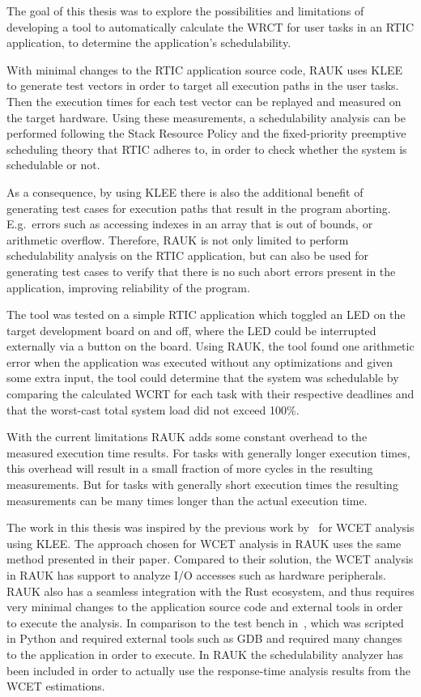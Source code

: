 The goal of this thesis was to explore the possibilities and limitations of
developing a tool to automatically calculate the WRCT for user tasks in an
RTIC application, to determine the application's schedulability.

With minimal changes to the RTIC application source code, RAUK uses KLEE to
generate test vectors in order to target all execution paths in the user tasks.
Then the execution times for each test vector can be replayed and measured on
the target hardware. Using these measurements, a schedulability analysis can be
performed following the Stack Resource Policy and the fixed-priority preemptive
scheduling theory that RTIC adheres to, in order to check whether the system is
schedulable or not.

As a consequence, by using KLEE there is also the additional benefit of
generating test cases for execution paths that result in the program aborting.
E.g.\ errors such as accessing indexes in an array that is out of bounds, or
arithmetic overflow. Therefore, RAUK is not only limited to perform
schedulability analysis on the RTIC application, but can also be used for
generating test cases to verify that there is no such abort errors present in
the application, improving reliability of the program.

The tool was tested on a simple RTIC application which toggled an LED on the
target development board on and off, where the LED could be interrupted
externally via a button on the board. Using RAUK, the tool found one arithmetic
error when the application was executed without any optimizations and given
some extra input, the tool could determine that the system was schedulable by
comparing the calculated WCRT for each task with their respective deadlines and
that the worst-cast total system load did not exceed 100\%.

With the current limitations RAUK adds some constant overhead to the measured
execution time results. For tasks with generally longer execution times, this
overhead will result in a small fraction of more cycles in the resulting
measurements. But for tasks with generally short execution times the resulting
measurements can be many times longer than the actual execution time.

The work in this thesis was inspired by the previous work by~\cite{lindner} for
WCET analysis using KLEE\@. The approach chosen for WCET analysis in RAUK uses
the same method presented in their paper. Compared to their solution, the WCET
analysis in RAUK has support to analyze I/O accesses such as hardware
peripherals. RAUK also has a seamless integration with the Rust ecosystem, and
thus requires very minimal changes to the application source code and external
tools in order to execute the analysis. In comparison to the test bench
in~\cite{lindner}, which was scripted in Python and required external tools
such as GDB and required many changes to the application in order to execute.
In RAUK the schedulability analyzer has been included in order to actually use
the response-time analysis results from the WCET estimations.

